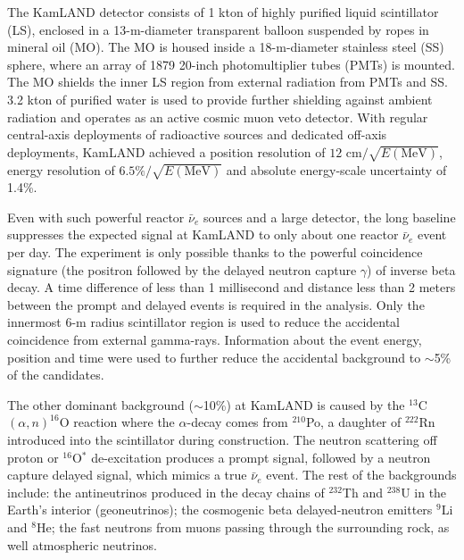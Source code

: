 The KamLAND detector consists of 1 kton of highly purified liquid scintillator (LS), enclosed in a 13-m-diameter transparent balloon suspended by ropes in mineral oil (MO). The MO is housed inside a 18-m-diameter stainless steel (SS) sphere, where an array of 1879 20-inch photomultiplier tubes (PMTs) is mounted. The MO shields the inner LS region from external radiation from PMTs and SS. 3.2 kton of purified water is used to provide further shielding against ambient radiation and operates as an active cosmic muon veto detector. With regular central-axis deployments of radioactive sources and dedicated off-axis deployments, KamLAND achieved a position resolution of $12$ cm$/\sqrt{E(\textrm{MeV})}$, energy resolution of $6.5\%/\sqrt{E(\textrm{MeV})}$ and absolute energy-scale uncertainty of 1.4\%.

Even with such powerful reactor $\bar\nu_e$ sources and a large detector, the long baseline suppresses the expected signal at KamLAND to only about one reactor $\bar\nu_e$ event per day. The experiment is only possible thanks to the powerful coincidence signature (the positron followed by the delayed neutron capture $\gamma$) of inverse beta decay. A time difference of less than 1 millisecond and distance less than 2 meters between the prompt and delayed events is required in the analysis. Only the innermost 6-m radius scintillator region is used to reduce the accidental coincidence from external gamma-rays. Information about the event energy, position and time were used to further reduce the accidental background to $\sim$5\% of the candidates.

The other dominant background ($\sim$10\%) at KamLAND is caused by the $^{13}$C$(\alpha,n)^{16}$O reaction where the $\alpha$-decay comes from $^{210}$Po, a daughter of $^{222}$Rn introduced into the scintillator during construction. The neutron scattering off proton or $^{16}$O$^*$ de-excitation produces a prompt signal, followed by a neutron capture delayed signal, which mimics a true $\bar\nu_e$ event. The rest of the backgrounds include: the antineutrinos produced in the decay chains of $^{232}$Th and $^{238}$U in the Earth's interior (geoneutrinos); the cosmogenic beta delayed-neutron emitters $^{9}$Li and $^{8}$He;  the fast neutrons from muons passing through the surrounding rock, as well atmospheric neutrinos. 

